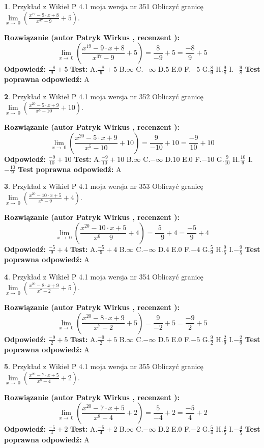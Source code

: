 \documentclass[12pt, a4paper]{article}
\theoremstyle{definition} %
\newtheorem{zad}{}
\newcommand{\zadStart}[1]{\begin{zad}#1\newline}
\newcommand{\zadStop}{\end{zad}}
\newcommand{\rozwStart}[2]{\noindent \textbf{Rozwiązanie (autor #1 , recenzent #2): }\newline}
\newcommand{\rozwStop}{\newline}
\newcommand{\odpStart}{\noindent \textbf{Odpowiedź:}\newline}
\newcommand{\odpStop}{\newline}
\newcommand{\testStart}{\noindent \textbf{Test:}\newline}
\newcommand{\testStop}{\newline}
\newcommand{\kluczStart}{\noindent \textbf{Test poprawna odpowiedź:}\newline}
\newcommand{\kluczStop}{\newline}
\begin{document}
\zadStart{Przykład z Wikieł P 4.1 moja wersja nr 351}
Obliczyć granicę $\lim\limits_{x\to\ 0}(\frac{x^{19}-9 \cdot x +8}{x^{37}-9}+5)$.
\zadStop
\rozwStart{Patryk Wirkus}{}
$$\lim\limits_{x\to\ 0}(\frac{x^{19}-9 \cdot x +8}{x^{37}-9}+5)=\frac{8}{-9}+5=\frac{-8}{9}+5$$
\rozwStop
\odpStart
$\frac{-8}{9}+5$
\odpStop
\testStart
A.$\frac{-8}{9}+5$
B.$\infty$
C.$-\infty$
D.$5$
E.$0$
F.$-5$
G.$\frac{8}{9}$
H.$\frac{9}{8}$
I.$-\frac{9}{8}$
\testStop
\kluczStart
A
\kluczStop



\zadStart{Przykład z Wikieł P 4.1 moja wersja nr 352}
Obliczyć granicę $\lim\limits_{x\to\ 0}(\frac{x^{20}-5 \cdot x +9}{x^{5}-10}+10)$.
\zadStop
\rozwStart{Patryk Wirkus}{}
$$\lim\limits_{x\to\ 0}(\frac{x^{20}-5 \cdot x +9}{x^{5}-10}+10)=\frac{9}{-10}+10=\frac{-9}{10}+10$$
\rozwStop
\odpStart
$\frac{-9}{10}+10$
\odpStop
\testStart
A.$\frac{-9}{10}+10$
B.$\infty$
C.$-\infty$
D.$10$
E.$0$
F.$-10$
G.$\frac{9}{10}$
H.$\frac{10}{9}$
I.$-\frac{10}{9}$
\testStop
\kluczStart
A
\kluczStop



\zadStart{Przykład z Wikieł P 4.1 moja wersja nr 353}
Obliczyć granicę $\lim\limits_{x\to\ 0}(\frac{x^{20}-10 \cdot x +5}{x^{6}-9}+4)$.
\zadStop
\rozwStart{Patryk Wirkus}{}
$$\lim\limits_{x\to\ 0}(\frac{x^{20}-10 \cdot x +5}{x^{6}-9}+4)=\frac{5}{-9}+4=\frac{-5}{9}+4$$
\rozwStop
\odpStart
$\frac{-5}{9}+4$
\odpStop
\testStart
A.$\frac{-5}{9}+4$
B.$\infty$
C.$-\infty$
D.$4$
E.$0$
F.$-4$
G.$\frac{5}{9}$
H.$\frac{9}{5}$
I.$-\frac{9}{5}$
\testStop
\kluczStart
A
\kluczStop



\zadStart{Przykład z Wikieł P 4.1 moja wersja nr 354}
Obliczyć granicę $\lim\limits_{x\to\ 0}(\frac{x^{20}-8 \cdot x +9}{x^{7}-2}+5)$.
\zadStop
\rozwStart{Patryk Wirkus}{}
$$\lim\limits_{x\to\ 0}(\frac{x^{20}-8 \cdot x +9}{x^{7}-2}+5)=\frac{9}{-2}+5=\frac{-9}{2}+5$$
\rozwStop
\odpStart
$\frac{-9}{2}+5$
\odpStop
\testStart
A.$\frac{-9}{2}+5$
B.$\infty$
C.$-\infty$
D.$5$
E.$0$
F.$-5$
G.$\frac{9}{2}$
H.$\frac{2}{9}$
I.$-\frac{2}{9}$
\testStop
\kluczStart
A
\kluczStop



\zadStart{Przykład z Wikieł P 4.1 moja wersja nr 355}
Obliczyć granicę $\lim\limits_{x\to\ 0}(\frac{x^{20}-7 \cdot x +5}{x^{8}-4}+2)$.
\zadStop
\rozwStart{Patryk Wirkus}{}
$$\lim\limits_{x\to\ 0}(\frac{x^{20}-7 \cdot x +5}{x^{8}-4}+2)=\frac{5}{-4}+2=\frac{-5}{4}+2$$
\rozwStop
\odpStart
$\frac{-5}{4}+2$
\odpStop
\testStart
A.$\frac{-5}{4}+2$
B.$\infty$
C.$-\infty$
D.$2$
E.$0$
F.$-2$
G.$\frac{5}{4}$
H.$\frac{4}{5}$
I.$-\frac{4}{5}$
\testStop
\kluczStart
A
\kluczStop
\end{document}
